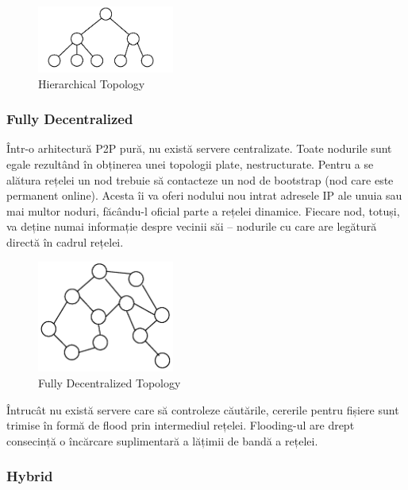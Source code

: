 \begin{figure}
  \centering
  \includegraphics[width=0.4\textwidth]{src/img/p2p-systems/hierarchical}
  \caption{Hierarchical Topology}
  \label{fig:p2p-systems:hierarchical}
\end{figure}

\subsubsection{Fully Decentralized}

Într-o arhitectură P2P pură, nu există servere centralizate. Toate nodurile
sunt egale rezultând în obținerea unei topologii plate, nestructurate. Pentru
a se alătura rețelei un nod trebuie să contacteze un nod de bootstrap (nod
care este permanent online). Acesta îi va oferi nodului nou intrat adresele IP
ale unuia sau mai multor noduri, făcându-l oficial parte a rețelei dinamice.
Fiecare nod, totuși, va deține numai informație despre vecinii săi – nodurile
cu care are legătură directă în cadrul rețelei.

\begin{figure}
  \centering
  \includegraphics[width=0.4\textwidth]{src/img/p2p-systems/decentralized}
  \caption{Fully Decentralized Topology}
  \label{fig:p2p-systems:decentralized}
\end{figure}

Întrucât nu există servere care să controleze căutările, cererile pentru
fișiere sunt trimise în formă de flood prin intermediul rețelei. Flooding-ul
are drept consecință o încărcare suplimentară a lățimii de bandă a rețelei.

\subsubsection{Hybrid}

